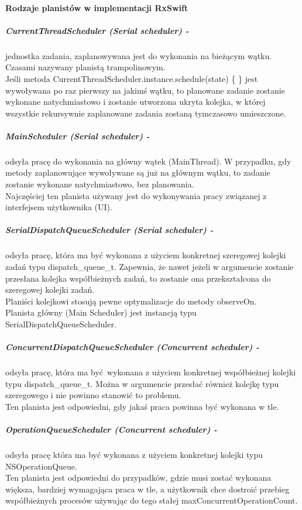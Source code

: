 \documentclass[12pt,oneside,a4paper]{report}
\begin{document}
\paragraph{Rodzaje planistów w implementacji RxSwift}
\subparagraph{CurrentThreadScheduler (Serial scheduler) -}jednostka zadania, zaplanowywana jest do wykonania na bieżącym wątku. Czasami nazywany planistą trampolinowym. \\
Jeśli metoda CurrentThreadScheduler.instance.schedule(state) \{ \} jest wywoływana po raz pierwszy na jakimś wątku, to planowane zadanie zostanie wykonane natychmiastowo i zostanie utworzona ukryta kolejka, w której wszystkie rekursywnie zaplanowane zadania zostaną tymczasowo umieszczone.
\subparagraph{MainScheduler (Serial scheduler) -}odsyła pracę do wykonania na główny wątek (MainThread). W przypadku, gdy metody zaplanowujące wywoływane są już na głównym wątku, to zadanie zostanie wykonane natychmiastowo, bez planowania.\\
Najczęściej ten planista używany jest do wykonywania pracy związanej z interfejsem użytkownika (UI).
\subparagraph{SerialDispatchQueueScheduler (Serial scheduler) -}
odsyła pracę, która ma być wykonana z użyciem konkretnej szeregowej kolejki zadań typu dispatch\_queue\_t. Zapewnia, że nawet jeżeli w argumencie zostanie przesłana kolejka współbieżnych zadań, to zostanie ona przekształcona do szeregowej kolejki zadań.\\
Planiści kolejkowi stosują pewne optymalizacje do metody observeOn.\\
Planista główny (Main Scheduler) jest instancją typu SerialDispatchQueueScheduler.
\subparagraph{ConcurrentDispatchQueueScheduler (Concurrent scheduler) -}odsyła pracę, która ma być wykonana z użyciem konkretnej współbieżnej kolejki  typu dispatch\_queue\_t. Można w argumencie przesłać również kolejkę typu szeregowego i nie powinno stanowić to problemu.\\
Ten planista jest odpowiedni, gdy jakaś praca powinna być wykonana w tle.
\subparagraph{OperationQueueScheduler (Concurrent scheduler) -}odsyła pracę która ma być wykonana z użyciem konkretnej kolejki typu NSOperationQueue.\\
Ten planista jest odpowiedni do przypadków, gdzie musi zostać wykonana większa, bardziej wymagająca praca w tle, a użytkownik chce dostroić przebieg współbieżnych procesów używając do tego stałej maxConcurrentOperationCount.
\end{document}
